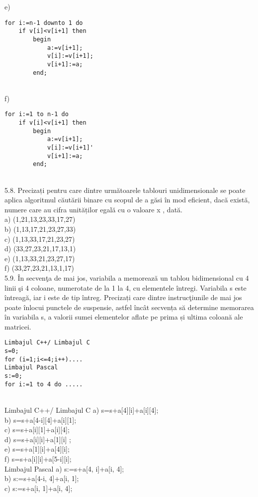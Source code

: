 e) \begin{verbatim}
for i:=n-1 downto 1 do
    if v[i]<v[i+1] then
        begin
            a:=v[i+1];
            v[i]:=v[i+1];
            v[i+1]:=a;
        end;
\end{verbatim}
\\
f) \begin{verbatim}
for i:=1 to n-1 do
    if v[i]<v[i+1] then
        begin
            a:=v[i+1];
            v[i]:=v[i+1]'
            v[i+1]:=a;
        end;
\end{verbatim}
\\
5.8. Precizați pentru care dintre următoarele tablouri unidimensionale se poate aplica algoritmul căutării binare cu scopul de a găsi în mod eficient, dacă există, numere care au cifra unităților egală cu o valoare x , dată.
\\
a) (1,21,13,23,33,17,27)
\\
b) (1,13,17,21,23,27,33)
\\
c) (1,13,33,17,21,23,27)
\\
d) (33,27,23,21,17,13,1)
\\
e) (1,13,33,21,23,27,17)
\\
f) (33,27,23,21,13,1,17)
\\
5.9. În secvenţa de mai jos, variabila a memorează un tablou bidimensional cu 4 linii şi 4 coloane, numerotate de la 1 la 4, cu elementele întregi. Variabila s este întreagă, iar i este de tip întreg. Precizați care dintre instrucţiunile de mai jos poate înlocui punctele de suspensie, astfel încât secvența să determine memorarea în variabila s, a valorii sumei elementelor aflate pe prima și ultima coloană ale matricei.
\begin{verbatim}
Limbajul C++/ Limbajul C
s=0;
for (i=1;i<=4;i++)....
Limbajul Pascal
s:=0;
for i:=1 to 4 do .....
\end{verbatim}
\\
Limbajul C++/ Limbajul C
a) s=s+a[4][i]+a[i][4];
\\
b) s=s+a[4-i][4]+a[i][1];
\\
c) s=s+a[i][1]+a[i][4];
\\
d) s=s+a[i][i]+a[1][i] ;
\\
e) s=s+a[1][i]+a[4][i];
\\
f) s=s+a[i][i]+a[5-i][i];
\\
Limbajul Pascal
a) s:=s+a[4, i]+a[i, 4];
\\
b) s:=s+a[4-i, 4]+a[i, 1];
\\
c) s:=s+a[i, 1]+a[i, 4];
\\
